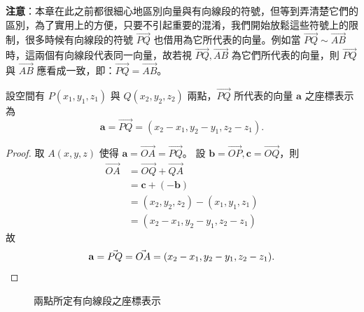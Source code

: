 \textbf{注意}：本章在此之前都很細心地區別向量與有向線段的符號，但等到弄清楚它們的區別，為了實用上的方便，只要不引起重要的混淆，我們開始放鬆這些符號上的限制，很多時候有向線段的符號 $\vec{PQ}$ 也借用為它所代表的向量。例如當 $\vec{PQ} \sim \vec{AB}$ 時，這兩個有向線段代表同一向量，故若視 $\vec{PQ}, \vec{AB}$ 為它們所代表的向量，則 $\vec{PQ}$ 與 $\vec{AB}$ 應看成一致，即：$\vec{PQ} = \vec{AB}$。

\begin{example}[論例 3]
設空間有 $P(x_1, y_1, z_1)$ 與 $Q(x_2, y_2, z_2)$ 兩點，$\vec{PQ}$ 所代表的向量 $\mathbf{a}$ 之座標表示為
\[ \mathbf{a} = \vec{PQ} = (x_2 - x_1, y_2 - y_1, z_2 - z_1). \]
\end{example}

\begin{proof}
取 $A(x, y, z)$ 使得 $\mathbf{a} = \vec{OA} = \vec{PQ}$。
設 $\mathbf{b} = \vec{OP}, \mathbf{c} = \vec{OQ}$，則
\begin{align*}
\vec{OA} &= \vec{OQ} + \vec{QA} \\
&= \mathbf{c} + (-\mathbf{b}) \\
&= (x_2, y_2, z_2) - (x_1, y_1, z_1) \\
&= (x_2 - x_1, y_2 - y_1, z_2 - z_1)
\end{align*}
故
\[ \mathbf{a} = \vec{PQ} = \vec{OA} = (x_2 - x_1, y_2 - y_1, z_2 - z_1). \qedhere \]
\end{proof}

\begin{figure}[H]
\centering
{}
\caption{兩點所定有向線段之座標表示}
\label{fig:b3s-fig3-22}
\end{figure}

